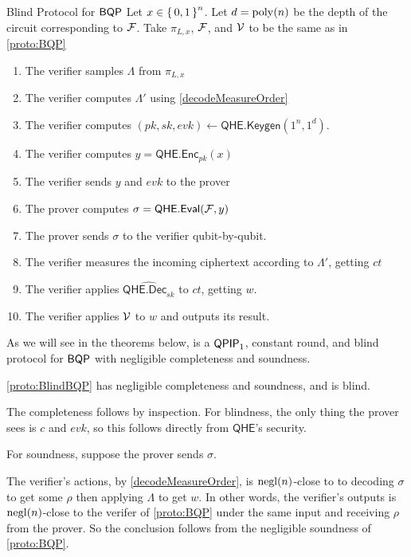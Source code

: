 \begin{protocol}{Blind Protocol for $\operatorname{\mathsf{BQP}}$}
	\label{proto:BlindBQP}
	Let $x\in\set{0,1}^n$.
	Let $d=\operatorname*{\operatorname{poly}}(n)$ be the depth of the circuit corresponding to $\mathcal{F}$.
	Take $\pi_{L, x}$, $\mathcal{F}$, and $\mathcal{V}$ to be the same as in \cref{proto:BQP}
	\begin{enumerate}
		\item The verifier samples $\Lambda$ from $\pi_{L, x}$
		\item The verifier computes $\Lambda'$ using \cref{decodeMeasureOrder}
		\item The verifier computes $(pk, sk, evk)\leftarrow\mathsf{QHE.Keygen}(1^n, 1^d)$.
		\item The verifier computes $y=\mathsf{QHE.Enc}_{pk}(x)$
		\item The verifier sends $y$ and $evk$ to the prover
		\item The prover computes $\sigma=\mathsf{QHE.Eval}(\mathcal{F}, y)$
		\item The prover sends $\sigma$ to the verifier qubit-by-qubit.
		\item The verifier measures the incoming ciphertext according to $\Lambda'$, getting $ct$
		\item The verifier applies $\widehat{\mathsf{QHE.Dec}_{sk}}$ to $ct$, getting $w$.
		\item The verifier applies $\mathcal{V}$ to $w$ and outputs its result.
	\end{enumerate}
\end{protocol}

As we will see in the theorems below,  is a $\operatorname{\mathsf{QPIP}}_1$, constant round, and blind protocol for $\operatorname{\mathsf{BQP}}$ with negligible completeness and soundness.

\begin{thm}
	\cref{proto:BlindBQP} has negligible completeness and soundness, and is blind.
\end{thm}
\begin{prf}
	The completeness follows by inspection.
	For blindness, the only thing the prover sees is $c$ and $evk$, so this follows directly from $\mathsf{QHE}$'s security.


	For soundness, suppose the prover sends $\sigma$.
    
	The verifier's actions, by \cref{decodeMeasureOrder}, is $\operatorname{negl}(n)$-close to to decoding $\sigma$ to get some $\rho$ then applying $\Lambda$ to get $w$.
	In other words, the verifier's outputs is $\operatorname{negl}(n)$-close to the verifer of \cref{proto:BQP} under the same input and receiving $\rho$ from the prover.
	So the conclusion follows from the negligible soundness of \cref{proto:BQP}.
\end{prf}

